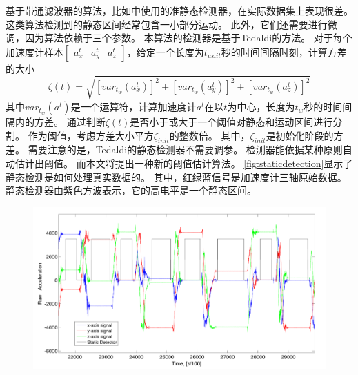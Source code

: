 \documentclass[
  type=master
]{gdutthesis}
\begin{document}
基于带通滤波器的算法，比如\parencite{fong2008methods}中使用的准静态检测器，在实际数据集上表现很差。
这类算法检测到的静态区间经常包含一小部分运动。
此外，它们还需要进行微调，因为算法依赖于三个参数。
本算法的检测器是基于Tedaldi的方法\cite{tedaldi2014robust}。
对于每个加速度计样本$\begin{bmatrix}
	a^t_x & a^t_y & a^t_z
\end{bmatrix}$，给定一个长度为$t_{wait}$秒的时间间隔时刻，计算方差的大小
\begin{equation}\label{eq:var}
	\zeta(t)=\sqrt{[var_{t_w}(a^t_x)]^2+[var_{t_w}(a^t_y)]^2+[var_{t_w}(a^t_z)]^2}
\end{equation}
其中$var_{t_w}(a^t)$是一个运算符，计算加速度计$a^t$在以$t$为中心，长度为$t_w$秒的时间间隔内的方差。
通过判断$\zeta(t)$是否小于或大于一个阈值对静态和运动区间进行分割。
作为阈值，考虑方差大小平方$\zeta_{init}$的整数倍。
其中，$\zeta_{init}$是初始化阶段的方差。
需要注意的是，Tedaldi的静态检测器不需要调参。
检测器能依据某种原则自动估计出阈值。
而本文将提出一种新的阈值估计算法。
\autoref{fig:staticdetection}显示了静态检测是如何处理真实数据的。
其中，红绿蓝信号是加速度计三轴原始数据。
静态检测器由紫色方波表示，它的高电平是一个静态区间。
\begin{figure}[H]
	\centering
	\includegraphics[width=1.0\textwidth]{屏幕截图 2022-04-03 103640.png}
	\label{fig:staticdetection}
\end{figure}
\end{document}
